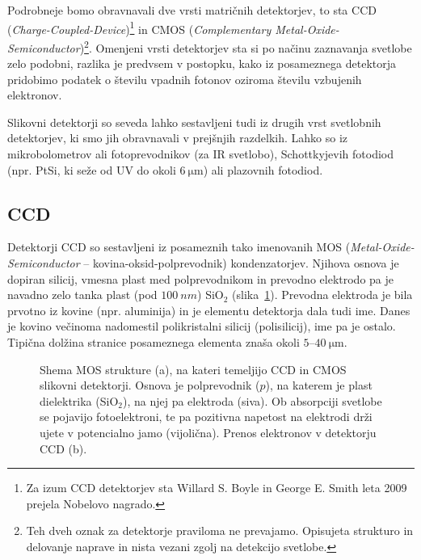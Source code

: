 Podrobneje bomo obravnavali dve vrsti matričnih detektorjev, to sta CCD 
({\it Charge-Coupled-Device})\footnote{Za izum CCD detektorjev sta Willard 
S. Boyle in George E. Smith  leta 2009 prejela Nobelovo nagrado.} 
in CMOS ({\it Complementary Metal-Oxide-Semiconductor})\footnote{Teh 
dveh oznak za detektorje praviloma ne prevajamo. Opisujeta 
strukturo in delovanje naprave in nista vezani zgolj na detekcijo svetlobe.}. Omenjeni vrsti
detektorjev sta si po načinu zaznavanja svetlobe zelo podobni, razlika
je predvsem v postopku, kako iz posameznega detektorja pridobimo podatek o številu 
vpadnih fotonov oziroma številu vzbujenih elektronov.

\begin{remark}
Slikovni detektorji so seveda lahko sestavljeni tudi iz drugih vrst svetlobnih detektorjev, 
ki smo jih obravnavali v prejšnjih razdelkih. Lahko so iz mikrobolometrov
ali fotoprevodnikov (za IR svetlobo),
Schottkyjevih fotodiod (npr. PtSi, ki seže od UV do
okoli $6~\si{\micro\meter}$) ali plazovnih fotodiod.
\end{remark}

\subsection*{CCD}
Detektorji CCD so sestavljeni iz posameznih tako imenovanih MOS 
({\it Metal-Oxide-Semiconductor}
-- kovina-oksid-polprevodnik) kondenzatorjev. Njihova osnova je dopiran silicij, vmesna 
plast med polprevodnikom in prevodno elektrodo pa je navadno zelo tanka plast (pod $100~\si{nm}$)
SiO$_2$ (slika~\ref{11_MOS}).
Prevodna elektroda je bila prvotno iz kovine (npr. aluminija) in je elementu detektorja dala tudi ime.
Danes je kovino večinoma nadomestil polikristalni silicij (polisilicij), ime pa je ostalo.
Tipična dolžina stranice posameznega elementa znaša okoli $5$--$40~\si{\micro\meter}$. 
\begin{figure}[h!]
\centering
\def\svgwidth{140truemm} 

\caption{Shema MOS strukture (a), na kateri temeljijo CCD in CMOS slikovni detektorji. Osnova je 
polprevodnik ($p$), na katerem je plast dielektrika (SiO$_2$), na njej pa elektroda (siva). 
Ob absorpciji svetlobe se pojavijo fotoelektroni, te pa pozitivna napetost
na elektrodi drži ujete v potencialno jamo (vijolična). Prenos elektronov v detektorju CCD (b).}
\label{11_MOS}
\end{figure}

